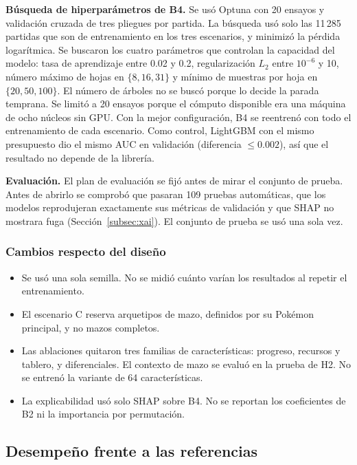 \noindent\textbf{Búsqueda de hiperparámetros de B4.} Se usó Optuna con 20
ensayos y validación cruzada de tres pliegues por partida. La búsqueda usó
solo las 11\,285 partidas que son de entrenamiento en los tres escenarios,
y minimizó la pérdida logarítmica. Se buscaron los cuatro parámetros que
controlan la capacidad del modelo: tasa de aprendizaje entre 0.02 y 0.2,
regularización $L_2$ entre $10^{-6}$ y 10, número máximo de hojas en
$\{8, 16, 31\}$ y mínimo de muestras por hoja en $\{20, 50, 100\}$. El
número de árboles no se buscó porque lo decide la parada temprana. Se limitó a 20
ensayos porque el cómputo disponible era una máquina de ocho núcleos sin
GPU. Con la mejor configuración, B4 se reentrenó con todo el entrenamiento
de cada escenario. Como control, LightGBM con el mismo presupuesto dio el
mismo AUC en validación (diferencia $\le 0.002$), así que el resultado no
depende de la librería.

\noindent\textbf{Evaluación.} El plan de evaluación se fijó antes de mirar
el conjunto de prueba. Antes de abrirlo se comprobó que pasaran 109 pruebas
automáticas, que los modelos reprodujeran exactamente sus métricas de
validación y que SHAP no mostrara fuga (Sección~\ref{subsec:xai}). El
conjunto de prueba se usó una sola vez.

\subsubsection{Cambios respecto del diseño}
\label{subsec:desviaciones}

\begin{itemize}
  \item Se usó una sola semilla. No se midió cuánto varían los resultados
        al repetir el entrenamiento.
  \item El escenario C reserva arquetipos de mazo, definidos por su
        Pok\'emon principal, y no mazos completos.
  \item Las ablaciones quitaron tres familias de características: progreso,
        recursos y tablero, y diferenciales. El contexto de mazo se evaluó
        en la prueba de H2. No se entrenó la variante de 64 características.
  \item La explicabilidad usó solo SHAP sobre B4. No se reportan los
        coeficientes de B2 ni la importancia por permutación.
\end{itemize}

\subsection{Desempeño frente a las referencias}
\label{subsec:resgeneral}

